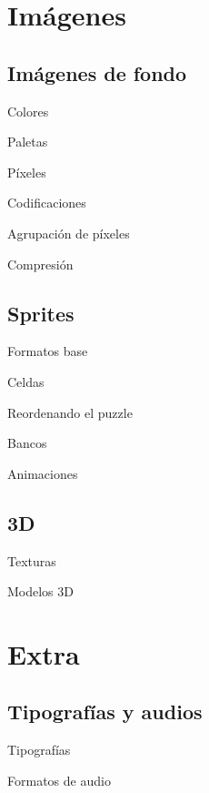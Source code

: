 \section{Imágenes}
\subsection{Imágenes de fondo}
\begin{frame}{Colores}
\end{frame}

\begin{frame}{Paletas}
\end{frame}

\begin{frame}{Píxeles}
\end{frame}

\begin{frame}{Codificaciones}
\end{frame}

\begin{frame}{Agrupación de píxeles}
\end{frame}

\begin{frame}{Compresión}
\end{frame}

\subsection{Sprites}
\begin{frame}{Formatos base}
\end{frame}

\begin{frame}{Celdas}
\end{frame}

\begin{frame}{Reordenando el puzzle}
\end{frame}

\begin{frame}{Bancos}
\end{frame}

\begin{frame}{Animaciones}
\end{frame}

\subsection{3D}
\begin{frame}{Texturas}
\end{frame}

\begin{frame}{Modelos 3D}
\end{frame}

\section{Extra}
\subsection{Tipografías y audios}
\begin{frame}{Tipografías}
\end{frame}

\begin{frame}{Formatos de audio}
\end{frame}
